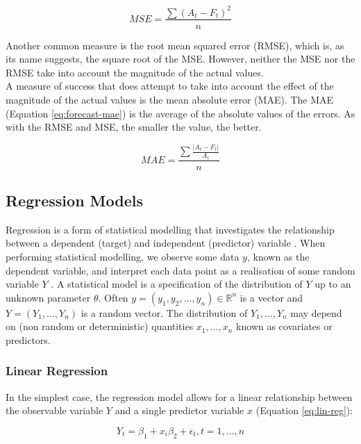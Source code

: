 \begin{equation}
\label{eq:forecast-mse}
    MSE = \frac{\sum(A_t-F_t)^2}{n}
\end{equation}

Another common measure is the root mean squared error (RMSE), which is, as its name suggests, the square root of the MSE. However, neither the MSE nor the RMSE take into account the magnitude of the actual values. \\

A measure of success that does attempt to take into account the effect of the magnitude of the actual values is the mean absolute error (MAE). The MAE (Equation \ref{eq:forecast-mae}) is the average of the absolute values of the errors. As with the RMSE and MSE, the smaller the value, the better.  

\begin{equation}
\label{eq:forecast-mae}
    MAE = \frac{\sum\frac{|A_t-F_t|}{A_t}}{n}
\end{equation}


\subsection{Regression Models}
\label{section:regression-models-research}

Regression is a form of statistical modelling that investigates the relationship between a dependent (target) and independent (predictor) variable \cite{regression-techniques}. When performing statistical modelling, we observe some data $y$, known as the dependent variable, and interpret each data point as a realisation of some random variable $Y$ \cite{m2s2-notes}. A statistical model is a specification of the distribution of $Y$ up to an unknown parameter $\theta$. Often $y = (y_1, y_2, ..., y_n) \in \mathbb{R} ^ n$ is a vector and $Y = (Y_1, ..., Y_n)$ is a random vector. The distribution of $Y_1, ..., Y_n$ may depend on (non random or deterministic) quantities $x_1, ..., x_n$ known as covariates or predictors. 

\subsubsection{Linear Regression}

In the simplest case, the regression model allows for a linear relationship between the observable variable $Y$ and a single predictor variable $x$ (Equation \ref{eq:lin-reg}): 

\begin{equation}
    Y_t = \beta_1 + x_i\beta_2 + \epsilon_t, t = 1, ..., n
    \label{eq:lin-reg}
\end{equation}

